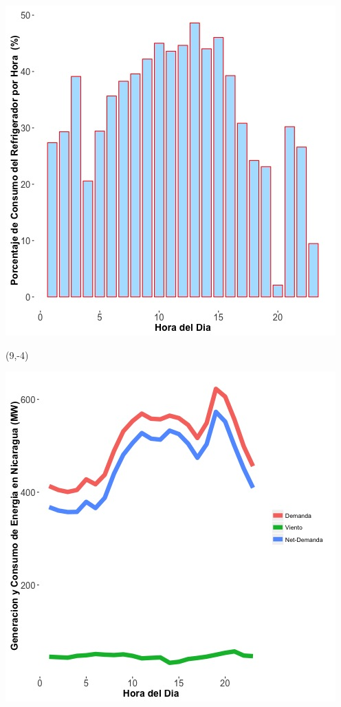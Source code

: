 \documentclass{article}\usepackage[]{graphicx}\usepackage[]{color}
\newenvironment{knitrout}{}{} %
\begin{document}
\begin{knitrout}
\color{fgcolor}
\includegraphics[scale=0.65]{figure/A1_fridge_energy_pct.jpg} 
\end{knitrout}

\begin{textblock}{1}(9,-4)
\begin{minipage}{20em}
\begingroup

\endgroup
\end{minipage}
\end{textblock}



 \vspace{20cm}


\begin{knitrout}
\color{fgcolor}
\includegraphics[scale=0.65]{figure/gridplot1.jpg} 
\end{knitrout}
\end{document}
